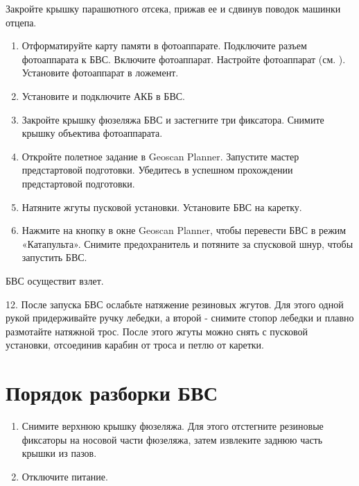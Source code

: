 \documentclass[a4paper,10pt,russian,openany]{sphinxmanual}
\begin{document}
Закройте крышку парашютного отсека, прижав ее и сдвинув поводок машинки отцепа.
\begin{enumerate}
\def\theenumi{\arabic{enumi}}
\def\labelenumi{\theenumi )}
\makeatletter\def\p@enumii{\p@enumi \theenumi )}\makeatother
\setcounter{enumi}{5}
\item {} 
Отформатируйте карту памяти в фотоаппарате. Подключите разъем фотоаппарата к БВС. Включите фотоаппарат. Настройте фотоаппарат (см. {\hyperref[\detokenize{camera::doc}]{}}). Установите фотоаппарат в ложемент.

\item {} 
Установите и подключите АКБ в БВС.

\item {} 
Закройте крышку фюзеляжа БВС и застегните три фиксатора. Снимите крышку объектива фотоаппарата.

\item {} 
Откройте полетное задание в Geoscan Planner. Запустите мастер предстартовой подготовки. Убедитесь в успешном прохождении предстартовой подготовки.

\item {} 
Натяните жгуты пусковой установки. Установите БВС на каретку.

\item {} 
Нажмите на кнопку  в окне Geoscan Planner, чтобы перевести БВС в режим «Катапульта». Снимите предохранитель и потяните за спусковой шнур, чтобы запустить БВС.

\end{enumerate}

БВС осуществит взлет.

12. После запуска БВС ослабьте натяжение резиновых жгутов. Для этого одной рукой придерживайте ручку лебедки, а второй - снимите стопор лебедки и плавно размотайте натяжной трос.
После этого жгуты можно снять с пусковой установки, отсоединив карабин от троса и петлю от каретки.


\chapter{Порядок разборки БВС}
\label{\detokenize{launch:id2}}\begin{enumerate}
\def\theenumi{\arabic{enumi}}
\def\labelenumi{\theenumi )}
\makeatletter\def\p@enumii{\p@enumi \theenumi )}\makeatother
\item {} 
Снимите верхнюю крышку фюзеляжа. Для этого отстегните резиновые фиксаторы на носовой части фюзеляжа, затем извлеките заднюю часть крышки из пазов.

\item {} 
Отключите питание.

\end{enumerate}
\end{document}
